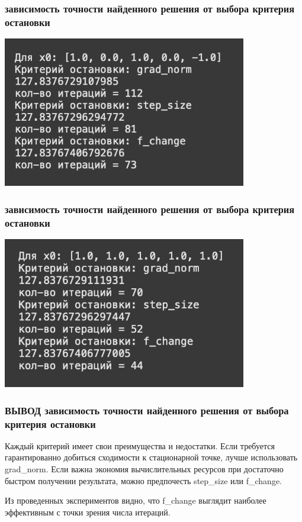 \documentclass[12pt,pdf,hyperref={unicode}]{beamer}
\begin{document}
\begin{frame}
\frametitle{ зависимость точности найденного решения от выбора критерия остановки}
\begin{center}
    \includegraphics[width=0.8\textwidth]{stop3.png}
\end{center}
\end{frame}

\begin{frame}
\frametitle{ зависимость точности найденного решения от выбора критерия остановки}
\begin{center}
    \includegraphics[width=0.8\textwidth]{stop4.png}
\end{center}
\end{frame}

\begin{frame}
\frametitle{ВЫВОД зависимость точности найденного решения от выбора критерия остановки}

Каждый критерий имеет свои преимущества и недостатки. Если требуется гарантированно добиться сходимости к стационарной точке, лучше использовать grad\_norm. Если важна экономия вычислительных ресурсов при достаточно быстром получении результата, можно предпочесть step\_size или f\_change.

Из проведенных экспериментов видно, что f\_change выглядит наиболее эффективным с точки зрения числа итераций.


\end{frame}
\end{document}
